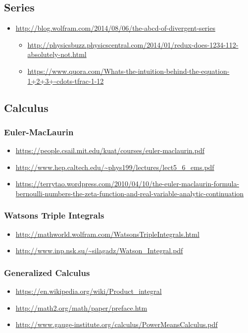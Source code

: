 \subsection{Series}

\begin{itemize}
\item \url{http://blog.wolfram.com/2014/08/06/the-abcd-of-divergent-series}
\begin{itemize}
\item \url{http://physicsbuzz.physicscentral.com/2014/01/redux-does-1234-112-absolutely-not.html}
\item \url{https://www.quora.com/Whats-the-intuition-behind-the-equation-1+2+3+-cdots-tfrac-1-12}
\end{itemize}
\end{itemize}

\subsection{Calculus}

\subsubsection{Euler-MacLaurin}
\begin{itemize}
\item \url{https://people.csail.mit.edu/kuat/courses/euler-maclaurin.pdf}
\item \url{http://www.hep.caltech.edu/~phys199/lectures/lect5_6_ems.pdf}
\item \url{https://terrytao.wordpress.com/2010/04/10/the-euler-maclaurin-formula-bernoulli-numbers-the-zeta-function-and-real-variable-analytic-continuation}
\end{itemize}

\subsubsection{Watsons Triple Integrals}
\begin{itemize}
\item \url{http://mathworld.wolfram.com/WatsonsTripleIntegrals.html}
\item \url{http://www.inp.nsk.su/~silagadz/Watson_Integral.pdf}
\end{itemize}

\subsubsection{Generalized Calculus}
\begin{itemize}
\item \url{https://en.wikipedia.org/wiki/Product_integral}
\item \url{http://math2.org/math/paper/preface.htm}
\item \url{http://www.gauge-institute.org/calculus/PowerMeansCalculus.pdf}
\end{itemize}

